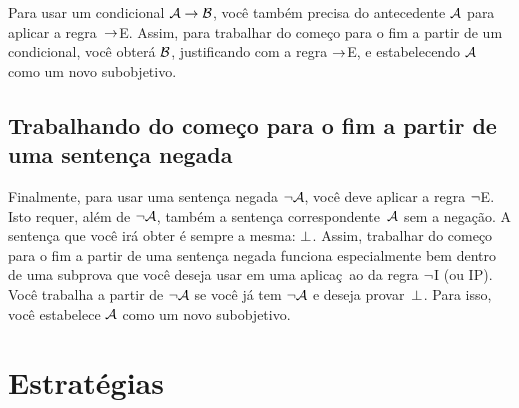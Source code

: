 Para usar um condicional $\mathcal{A} \rightarrow \mathcal{B}$, voc\^e tamb\'em precisa do antecedente $\mathcal{A}$ para aplicar a regra~$\rightarrow$E. Assim, para trabalhar do come\c co para o fim a partir de um condicional, voc\^e obter\'a $\mathcal{B}$, justificando com a regra $\rightarrow$E, e estabelecendo $\mathcal{A}$  como um  novo subobjetivo.
 

\begin{fitchproof}
	\ellipsesline 
\end{fitchproof}

\subsection*{ Trabalhando do come\c co para o fim a partir de uma senten\c ca negada}

Finalmente, para usar uma senten\c ca negada $\neg \mathcal{A}$, voc\^e deve aplicar a regra $\neg$E. Isto requer, al\'em de  $\neg \mathcal{A}$,  tamb\'em a senten\c ca correspondente~$\mathcal{A}$ sem a nega\c c\~ao. A senten\c ca que voc\^e ir\'a obter \'e sempre a mesma: $\bot$. Assim, trabalhar do come\c co para o fim a partir de uma senten\c ca negada funciona especialmente bem dentro de uma subprova que voc\^e deseja usar em uma aplica\c c~ao da regra $\neg$I (ou IP).  Voc\^e trabalha a partir de $\neg \mathcal{A}$ se voc\^e j\'a tem $\neg \mathcal{A}$ e deseja provar~$\bot$. Para isso, voc\^e estabelece $\mathcal{A}$ como um novo subobjetivo.
\begin{fitchproof}
	\ellipsesline 
\end{fitchproof}


\section{Estrat\'egias }

